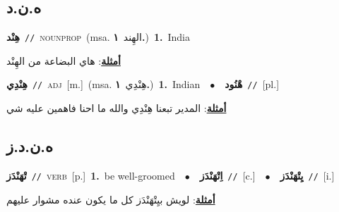 \documentclass[10pt,a4paper,twoside]{article} %
\begin{document}
\begin{multicols}{2}
\vspace{-3mm}
\subsection*{\color{blue}\foreignlanguage{arabic}{ه.ن.د}\color{blue}{}} 

{\setlength\topsep{0pt}\textbf{\foreignlanguage{arabic}{هِنْد}}\ {\color{gray}\texttt{//}\color{black}}\ \textsc{noun\textunderscore prop}\ \color{gray}(msa. \foreignlanguage{arabic}{الهِند}~\foreignlanguage{arabic}{\textbf{١.}})\color{black}\ \textbf{1.}~India\  \begin{flushright}\color{gray}\foreignlanguage{arabic}{\textbf{\underline{\foreignlanguage{arabic}{أمثلة}}}: هاي البضاعة من الهِنْد}\end{flushright}\color{black}} \vspace{2mm}

{\setlength\topsep{0pt}\textbf{\foreignlanguage{arabic}{هِنْدِي}}\ {\color{gray}\texttt{//}\color{black}}\ \textsc{adj}\ [m.]\ \color{gray}(msa. \foreignlanguage{arabic}{هِنْدِي}~\foreignlanguage{arabic}{\textbf{١.}})\color{black}\ \textbf{1.}~Indian\ \ $\bullet$\ \ \setlength\topsep{0pt}\textbf{\foreignlanguage{arabic}{هْنُود}}\ {\color{gray}\texttt{//}\color{black}}\ [pl.]\  \begin{flushright}\color{gray}\foreignlanguage{arabic}{\textbf{\underline{\foreignlanguage{arabic}{أمثلة}}}: المدير تبعنا هِنْدِي والله ما احنا فاهمين عليه شي}\end{flushright}\color{black}} \vspace{2mm}

\vspace{-3mm}
\subsection*{\color{blue}\foreignlanguage{arabic}{ه.ن.د.ز}\color{blue}{}} 

{\setlength\topsep{0pt}\textbf{\foreignlanguage{arabic}{تْهَنْدَز}}\ {\color{gray}\texttt{//}\color{black}}\ \textsc{verb}\ [p.]\ \textbf{1.}~be well-groomed\ \ $\bullet$\ \ \setlength\topsep{0pt}\textbf{\foreignlanguage{arabic}{اِتْهَنْدَز}}\ {\color{gray}\texttt{//}\color{black}}\ [c.]\ \ $\bullet$\ \ \setlength\topsep{0pt}\textbf{\foreignlanguage{arabic}{يِتْهَنْدَز}}\ {\color{gray}\texttt{//}\color{black}}\ [i.]\  \begin{flushright}\color{gray}\foreignlanguage{arabic}{\textbf{\underline{\foreignlanguage{arabic}{أمثلة}}}: لويش بيِتْهَنْدَز كل ما يكون عنده مشوار عليهم}\end{flushright}\color{black}} \vspace{2mm}


\end{multicols}
\end{document}
